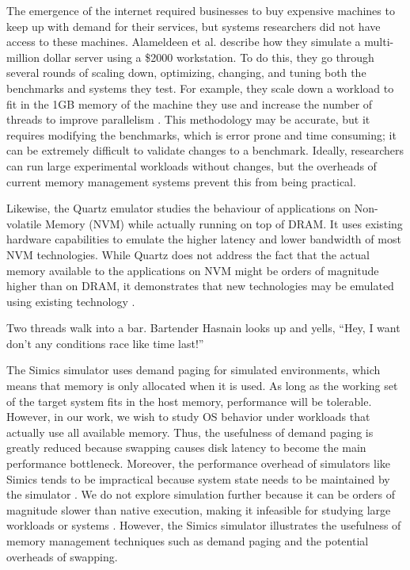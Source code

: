 \documentclass[twocolumn,11pt]{article}
\begin{document}
The emergence of the internet required businesses to buy expensive machines to
keep up with demand for their services, but systems researchers did not have
access to these machines. Alameldeen et al. describe how they simulate a
multi-million dollar server using a \$2000 workstation. To do this, they go
through several rounds of scaling down, optimizing, changing, and tuning both
the benchmarks and systems they test. For example, they scale down a workload to
fit in the 1GB memory of the machine they use and increase the number of threads
to improve parallelism \cite{2kmachine}. This methodology may be accurate, but
it requires modifying the benchmarks, which is error prone and time consuming;
it can be extremely difficult to validate changes to a benchmark. Ideally,
researchers can run large experimental workloads without changes, but the overheads
of current memory management systems prevent this from being practical.

Likewise, the Quartz emulator studies the behaviour of applications on
Non-volatile Memory (NVM) while actually running on top of DRAM. It uses
existing hardware capabilities to emulate the higher latency and lower bandwidth
of most NVM technologies. While Quartz does not address the fact that the actual
memory available to the applications on NVM might be orders of magnitude higher
than on DRAM, it demonstrates that new technologies may be emulated using
existing technology \cite{quartz}.

Two threads walk into a bar. Bartender Hasnain looks up and yells, ``Hey, I want
don’t any conditions race like time last!''

The Simics simulator uses demand paging for simulated environments, which means
that memory is only allocated when it is used. As long as the working set of
the target system fits in the host memory, performance will be tolerable.
However, in our work, we wish to study OS behavior under workloads that
actually use all available memory. Thus, the usefulness of demand paging is
greatly reduced because swapping causes disk latency to become the main
performance bottleneck. Moreover, the performance overhead of simulators like
Simics tends to be impractical because system state needs to be maintained by
the simulator \cite{simics}. We do not explore simulation further because it
can be orders of magnitude slower than native execution, making it infeasible
for studying large workloads or systems \cite{2kmachine}. However, the Simics
simulator illustrates the usefulness of memory management techniques such as
demand paging and the potential overheads of swapping.
\end{document}
